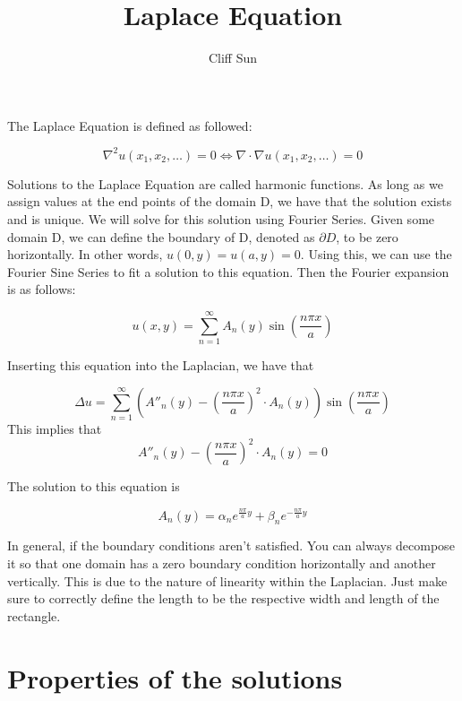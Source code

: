 \documentclass{article}
\title{Laplace Equation}
\author{Cliff Sun}
\begin{document}
\maketitle

The Laplace Equation is defined as followed:

\begin{equation}
    \nabla^2 u(x_1,x_2,\dots) = 0 \iff \nabla \cdot \nabla u(x_1,x_2,\dots) = 0
\end{equation}

Solutions to the Laplace Equation are called harmonic functions. As long as we assign values at the end points of the domain D, we have that the solution exists and is unique. We will
solve for this solution using Fourier Series. Given some domain D, we can define the boundary of D, denoted as $\partial D$, to be zero horizontally. In other words, $u(0,y) = u(a,y) = 0$. Using this, we can use the 
Fourier Sine Series to fit a solution to this equation. Then the Fourier expansion is as follows:

\begin{equation}
    u(x,y) = \sum_{n=1}^{\infty}A_n(y)\sin(\frac{n\pi x}{a})
\end{equation}

Inserting this equation into the Laplacian, we have that 

\begin{equation}
    \Delta u = \sum_{n = 1}^{\infty} (A''_n(y) - (\frac{n \pi x}{a})^2\cdot A_n(y))\sin(\frac{n\pi x}{a})
\end{equation}
This implies that 
\begin{equation}
    A''_n(y) - (\frac{n \pi x}{a})^2\cdot A_n(y) = 0
\end{equation}

The solution to this equation is 

\begin{equation}
    A_n(y) = \alpha_n e^{\frac{n\pi}{a}y} + \beta_n e^{-\frac{n\pi}{a}y}
\end{equation}

In general, if the boundary conditions aren't satisfied. You can always decompose it so that one domain has a zero boundary condition horizontally and another vertically.
This is due to the nature of linearity within the Laplacian. Just make sure to correctly define the length to be the respective width and length of the rectangle. 

\section*{Properties of the solutions}
\end{document}
